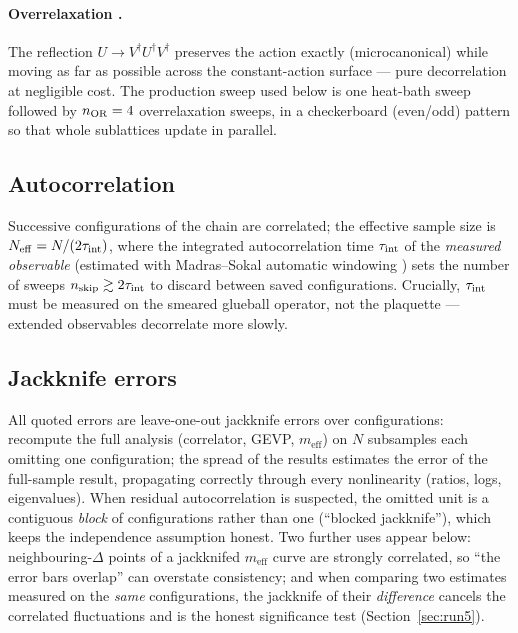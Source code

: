 \documentclass[11pt,a4paper]{article}
\newcommand{\meff}{m_{\mathrm{eff}}}
\begin{document}
\paragraph{Overrelaxation \cite{Creutz1987}.} The reflection
$U \to V^\dagger U^\dagger V^\dagger$ preserves the action exactly
(microcanonical) while moving as far as possible across the constant-action
surface --- pure decorrelation at negligible cost. The production sweep used
below is one heat-bath sweep followed by $n_{\rm OR}=4$ overrelaxation sweeps,
in a checkerboard (even/odd) pattern so that whole sublattices update in
parallel.

\subsection{Autocorrelation}

Successive configurations of the chain are correlated; the effective sample
size is $N_{\rm eff} = N / (2\tau_{\rm int})$, where the integrated
autocorrelation time $\tau_{\rm int}$ of the \emph{measured observable}
(estimated with Madras--Sokal automatic windowing \cite{MadrasSokal1988}) sets
the number of sweeps $n_{\rm skip}\gtrsim 2\tau_{\rm int}$ to discard between
saved configurations. Crucially, $\tau_{\rm int}$ must be measured on the
smeared glueball operator, not the plaquette --- extended observables
decorrelate more slowly.

\subsection{Jackknife errors}

All quoted errors are leave-one-out jackknife errors over configurations:
recompute the full analysis (correlator, GEVP, $\meff$) on $N$ subsamples each
omitting one configuration; the spread of the results estimates the error of
the full-sample result, propagating correctly through every nonlinearity
(ratios, logs, eigenvalues). When residual autocorrelation is suspected, the
omitted unit is a contiguous \emph{block} of configurations rather than one
(``blocked jackknife''), which keeps the independence assumption honest. Two
further uses appear below: neighbouring-$\Delta$ points of a jackknifed
$\meff$ curve are strongly correlated, so ``the error bars overlap'' can
overstate consistency; and when comparing two estimates measured on the
\emph{same} configurations, the jackknife of their \emph{difference} cancels
the correlated fluctuations and is the honest significance test
(Section~\ref{sec:run5}).
\end{document}
